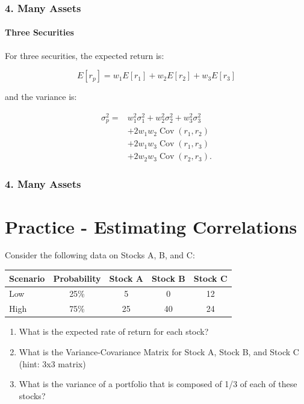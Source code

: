 \documentclass{beamer}
\begin{document}
\begin{frame}[t]
\frametitle{4. Many Assets}
\framesubtitle{Three Securities}

    For three securities, the expected return is:
    
        \[
        E[r_p]
        =
        w_1E[r_1]
        +w_2E[r_2]
        +w_3E[r_3]
        \]
        
    and the variance is:
    
        \[
        \begin{aligned}
        \sigma_p^2
        ={}&
        w_1^2\sigma_1^2
        +w_2^2\sigma_2^2
        +w_3^2\sigma_3^2\\
        &+2w_1w_2\operatorname{Cov}(r_1,r_2)\\
        &+2w_1w_3\operatorname{Cov}(r_1,r_3)\\
        &+2w_2w_3\operatorname{Cov}(r_2,r_3).
        \end{aligned}
        \]

\end{frame}


\begin{practiceframe}
    \frametitle{4. Many Assets}
    \section{Practice - Estimating Correlations}

    Consider the following data on Stocks A, B, and C:

    \begin{table}
        \begin{tabular}{lcccc}
        \toprule
        Scenario & Probability & Stock A & Stock B & Stock C\\
        \midrule
        Low & 25\% & 5 & 0 & 12 \\
        High &75\% & 25 & 40 & 24 \\
        \bottomrule
        \end{tabular}
    \end{table}

    \begin{enumerate}
        \item	What is the expected rate of return for each stock?
        \item	What is the Variance-Covariance Matrix for Stock A, Stock B, and Stock C (hint: 3x3 matrix)
        \item What is the variance of a portfolio that is composed of 1/3 of each of these stocks?
    \end{enumerate}
    
\end{practiceframe}
\end{document}
